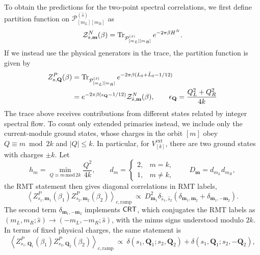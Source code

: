 \documentclass[11pt]{article}
\numberwithin{equation}{section}
\begin{document}
To obtain the predictions for the two-point spectral correlations, we first define partition function on $\mathcal P_{[m_L][m_R]}^{(\hat s)}$ as
\begin{align}
    \mathcal Z^N_{\hat s,\mathbf m}(\beta)=\operatorname{Tr}_{\mathcal P_{[m_L][m_R]}^{(\hat s)}}e^{-2\pi\beta H^N}.
\end{align}
If we instead use the physical generators in the trace, the partition function is given by
\begin{align}
     Z^P_{s,\mathbf Q}(\beta)&=\operatorname{Tr}_{\mathcal P_{[m_L][m_R]}^{(\hat s)}} e^{-2\pi\beta (L_0+\bar L_0-1/12)}\nonumber \\
     &=e^{-2\pi\beta(\epsilon_{\mathbf Q}-1/12)} \mathcal Z^N_{\hat s,\mathbf m}(\beta), \qquad \epsilon_{\mathbf Q}=\frac{Q_L^2+Q_R^2}{4k}
     \label{equ:Z_p_partition}
\end{align}
The trace above receives contributions from different states related by integer spectral flow. To count only extended primaries instead, we include only the current-module ground states, whose charges in the orbit $[m]$ obey $Q\equiv m\bmod2k$ and $|Q|\le k$. In particular, for $V_{[k]}^{\mathrm{ext}}$, there are two ground states with charges $\pm k$. Let
\begin{equation}
h_m=\min_{Q\equiv m\,\mathrm{mod}\,2k}\frac{Q^2}{4k},
\qquad d_m=\begin{cases}2,&m=k,\\1,&m\ne k,\end{cases}
\qquad D_{\mathbf m}=d_{m_L}d_{m_R},
\end{equation}
the RMT statement then gives diagonal correlations in RMT labels,
\begin{equation}
\left\langle Z^P_{s_1,\mathbf m_1}(\beta_1)
 Z^P_{s_2,\mathbf m_2}(\beta_2)\right\rangle_{c,\mathrm{ramp}}
 \ \propto\ D_{\mathbf m_1}^2\delta_{\hat s_1,\hat s_2}
 \left(\delta_{\mathbf m_1,\mathbf m_2}
       +\delta_{\mathbf m_1,-\mathbf m_2}\right).
\label{eq:diagonal-prediction}
\end{equation}
The second term $\delta_{\mathbf m_1,-\mathbf m_2}$ implements $\mathsf{CRT}$, which conjugates the RMT labels as $(m_L,m_R;\hat s) \rightarrow (-m_L,-m_R;\hat s)$, with the minus signs understood modulo $2k$. In terms of fixed physical charges, the same statement is
\begin{equation}
\left\langle Z^P_{s_1,\mathbf Q_1}(\beta_1)
 Z^P_{s_2,\mathbf Q_2}(\beta_2)\right\rangle_{c,\mathrm{ramp}}
 \ \propto\ \delta(s_1,\mathbf Q_1;s_2,\mathbf Q_2)
 +\delta(s_1,\mathbf Q_1;s_2,-\mathbf Q_2),
\label{SFF_untwisted_bdy}
\end{equation}
\end{document}
